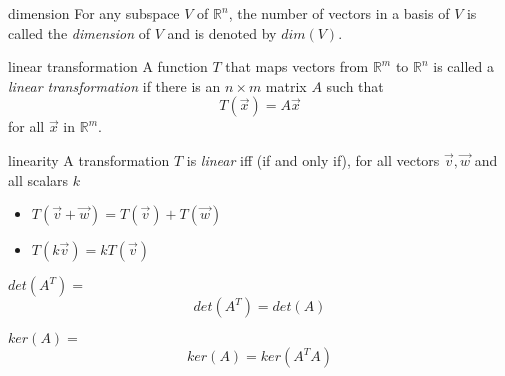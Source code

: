 \documentclass[avery5371,grid,letterpaper]{flashcards}
\newcommand{\Rn}{\mathbb{R}^{n}}
\newcommand{\Rm}{\mathbb{R}^{m}}
\newcommand{\nbym}{n\times m}
\begin{document}
\begin{flashcard}[Definition]{dimension}
For any subspace $V$ of $\Rn$, the number of vectors in a basis of $V$
is called the \textit{dimension} of $V$ and is denoted by $dim(V)$.
\end{flashcard}



\begin{flashcard}[Definition]{linear transformation}
A function $T$ that maps vectors from $\Rm$ to $\Rn$ is called a
\textit{linear transformation} if there is an $\nbym$ matrix $A$
such that
\begin{displaymath}
T(\vec{x}) = A\vec{x}
\end{displaymath}
for all $\vec{x}$ in $\Rm$.
\end{flashcard}

\begin{flashcard}[Theorem]{linearity}
A transformation $T$ is \textit{linear} iff (if and only if),
for all vectors $\vec{v}, \vec{w}$ and all scalars $k$
\begin{itemize}
\item $T(\vec{v} + \vec{w}) = T(\vec{v}) + T(\vec{w})$
\item $T(k \vec{v}) = k T(\vec{v})$
\end{itemize}
\end{flashcard}

\begin{flashcard}[Theorem]{$det(A^{T}) = $}
\begin{displaymath}
det(A^{T}) = det(A)
\end{displaymath}
\end{flashcard}

\begin{flashcard}[Theorem]{$ker(A) = $}
\begin{displaymath}
ker(A) = ker(A^{T}A)
\end{displaymath}
\end{flashcard}
\end{document}
